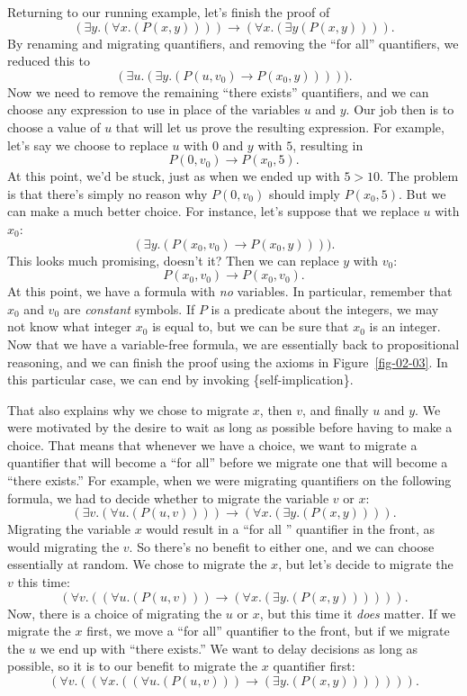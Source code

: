 Returning to our running example, let's finish the proof of 
$$(\exists y.(\forall x.(P(x, y)))) \rightarrow (\forall x.(\exists y (P(x, y)))).$$
By renaming and migrating quantifiers, and removing the ``for all'' quantifiers, we reduced
this to
$$(\exists u.(\exists y.(P(u, v_0) \rightarrow P(x_0, y))))).$$
Now we need to remove the remaining ``there exists'' quantifiers, and we can choose any
expression to use in place of the variables $u$ and $y$. Our job then is to choose a value
of $u$ that will let us prove the resulting expression. For example, let's say we choose
to replace $u$ with $0$ and $y$ with $5$, resulting in
$$P(0, v_0) \rightarrow P(x_0, 5).$$
At this point, we'd be stuck, just as when we ended up with $5 > 10$. The problem is that
there's simply no reason why $P(0, v_0)$ should imply $P(x_0, 5)$. But we can make a much
better choice. For instance, let's suppose that we replace $u$ with $x_0$:
$$(\exists y.(P(x_0, v_0) \rightarrow P(x_0, y)))).$$
This looks much promising, doesn't it? Then we can replace $y$ with $v_0$:
$$P(x_0, v_0) \rightarrow P(x_0, v_0).$$
At this point, we have a formula with \emph{no} variables. In particular, remember that
$x_0$ and $v_0$ are \emph{constant} symbols. If $P$ is a predicate about the integers, we 
may not know what integer $x_0$ is equal to, but we can be sure that $x_0$ is an integer.
Now that we have a variable-free formula, we are essentially back to propositional reasoning,
and we can finish the proof using the axioms in Figure~\ref{fig-02-03}. In this particular
case, we can end by invoking \{self-implication\}.

That also explains why we chose to migrate $x$, then $v$, and finally $u$ and $y$.
We were motivated by the desire to wait as long as possible before having to make
a choice. That means that whenever we have a choice, we want to migrate a quantifier
that will become a ``for all'' before we migrate one that will become a ``there exists.'' 
For example, when we were migrating quantifiers on the following formula, we had to 
decide whether to migrate the variable $v$ or $x$:
$$(\exists v.(\forall u.(P(u, v)))) \rightarrow (\forall x.(\exists y.(P(x, y)))).$$
Migrating the variable $x$ would result in a ``for all '' quantifier in the front,
as would migrating the $v$. So there's no benefit to either one, and we can choose
essentially at random. We chose to migrate the $x$, but let's decide to migrate
the $v$ this time:
$$(\forall v.((\forall u.(P(u, v))) \rightarrow (\forall x.(\exists y.(P(x, y)))))).$$
Now, there is a choice of migrating the $u$ or $x$, but this time it \emph{does}
matter. If we migrate the $x$ first, we move a ``for all'' quantifier to the front,
but if we migrate the $u$ we end up with ``there exists.'' We want to delay decisions
as long as possible, so it is to our benefit to migrate the $x$ quantifier first:
$$(\forall v.((\forall x.((\forall u.(P(u, v))) \rightarrow (\exists y.(P(x, y))))))).$$

